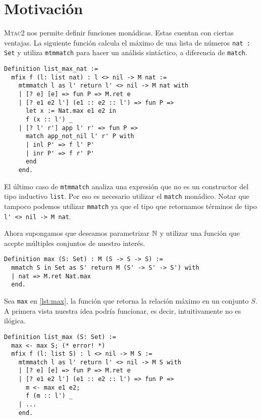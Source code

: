 \chapter{Motivación}\label{ch:motivacion}

\textsc{Mtac2} nos permite definir funciones monádicas. Estas cuentan con ciertas ventajas.
La siguiente función calcula el máximo de una lista de números \lstinline{nat : Set} y utiliza \lstinline{mtmmatch} para hacer un análisis sintáctico, a diferencia de \lstinline{match}.

\begin{lstlisting}[frame=tb,caption={Función \lstinline{list_max_nat}},label=lst:list_max_nat]
Definition list_max_nat :=
  mfix f (l: list nat) : l <> nil -> M nat :=
    mtmmatch l as l' return l' <> nil -> M nat with
    | [? e] [e] => fun P => M.ret e
    | [? e1 e2 l'] (e1 :: e2 :: l') => fun P =>
      let x := Nat.max e1 e2 in
      f (x :: l') _
    | [? l' r'] app l' r' => fun P =>
      match app_not_nil l' r' P with
      | inl P' => f l' P'
      | inr P' => f r' P'
      end
    end.
\end{lstlisting}

El último caso de \lstinline{mtmmatch} analiza una expresión que no es un constructor del tipo inductivo \lstinline{list}. Por eso es necesario utilizar el \lstinline{match} monádico.
Notar que tampoco podemos utilizar \lstinline{mmatch} ya que el tipo que retornamos términos de tipo \lstinline{l' <> nil -> M nat}.

Ahora supongamos que deseamos parametrizar $\mathbb{N}$ y utilizar una función que acepte múltiples conjuntos de nuestro interés.

\begin{lstlisting}[frame=tb,caption={Función \lstinline{max}},label=lst:max]
Definition max (S: Set) : M (S -> S -> S) :=
  mmatch S in Set as S' return M (S' -> S' -> S') with
  | nat => M.ret Nat.max
  end.
\end{lstlisting}

Sea \lstinline{max} en \ref{lst:max}, la función que retorna la relación máximo en un conjunto $S$.
A primera vista nuestra idea podría funcionar, es decir, intuitivamente no es ilógica.

\begin{lstlisting}[frame=tb,caption={Función \lstinline{list_max}},label=lst:list_max]
Definition list_max (S: Set) :=
  max <- max S; (* error! *)
  mfix f (l: list S) : l <> nil -> M S :=
    mtmmatch l as l' return l' <> nil -> M S with
    | [? e] [e] => fun P => M.ret e
    | [? e1 e2 l'] (e1 :: e2 :: l') => fun P =>
      m <- max e1 e2;
      f (m :: l') _
    | ...
    end.
\end{lstlisting}

